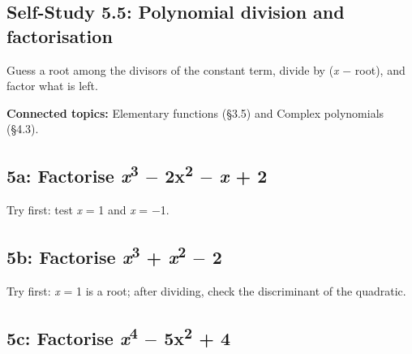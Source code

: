 \documentclass[11pt]{article}
\begin{document}
\begin{keepsection}
\section{Self-Study 5.5: Polynomial division and factorisation}

Guess a root among the divisors of the constant term, divide by (\textit{x} \ensuremath{-} root), and factor what is left.

\textbf{Connected topics:} Elementary functions (§3.5) and Complex polynomials (§4.3).

\begin{keepsection}
\subsection{5a: Factorise \textit{x}\textsuperscript{3} \ensuremath{-} 2x\textsuperscript{2} \ensuremath{-} \textit{x} + 2}

Try first: test \textit{x} = 1 and \textit{x} = \ensuremath{-}1.

\end{keepsection}

\begin{keepsection}
\subsection{5b: Factorise \textit{x}\textsuperscript{3} + \textit{x}\textsuperscript{2} \ensuremath{-} 2}

Try first: \textit{x} = 1 is a root; after dividing, check the discriminant of the quadratic.

\end{keepsection}

\begin{keepsection}
\subsection{5c: Factorise \textit{x}\textsuperscript{4} \ensuremath{-} 5x\textsuperscript{2} + 4}


\end{keepsection}
\end{keepsection}
\end{document}
